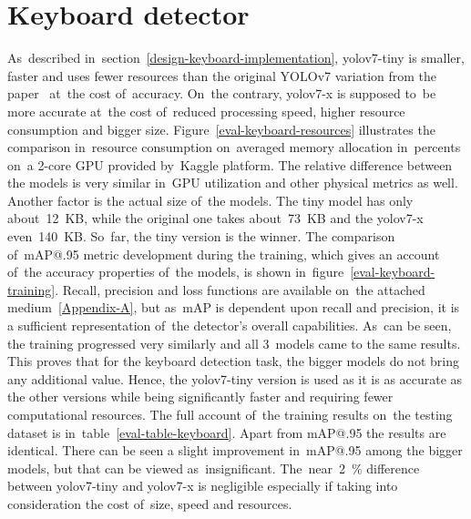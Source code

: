 \section{Keyboard detector}
\label{evaluation-keyboard}
As~described in~section~\ref{design-keyboard-implementation}, yolov7-tiny is smaller, faster and uses fewer resources than the original YOLOv7 variation from the paper~\cite{yolov7} at~the cost of~accuracy. On~the contrary, yolov7-x is supposed to~be more accurate at~the cost of~reduced processing speed, higher resource consumption and bigger size. Figure~\ref{eval-keyboard-resources} illustrates the comparison in~resource consumption on~averaged memory allocation in~percents on~a \hbox{2-core} GPU provided by~Kaggle platform. The relative difference between the models is very similar in~GPU utilization and other physical metrics as well. Another factor is the actual size of~the models. The tiny model has only about~12~KB, while the original one takes about~73~KB and the yolov7-x even~140~KB. So~far, the tiny version is the winner. The comparison of~mAP@.95 metric development during the training, which gives an account of~the accuracy properties of~the models, is shown in~figure~\ref{eval-keyboard-training}. Recall, precision and loss functions are available on~the attached medium~\ref{Appendix-A}, but as~mAP is dependent upon recall and precision, it is a sufficient representation of~the detector's overall capabilities. As~can be seen, the training progressed very similarly and all 3~models came to the same results. This proves that for the keyboard detection task, the bigger models do not bring any additional value. Hence, the yolov7-tiny version is used as it is as accurate as the other versions while being significantly faster and requiring fewer computational resources. The full account of~the training results on~the testing dataset is in~table~\ref{eval-table-keyboard}. Apart from mAP@.95 the results are identical. There can be seen a slight improvement in~mAP@.95 among the bigger models, but that can be viewed as~insignificant. The~near~2~\% difference between yolov7-tiny and yolov7-x is negligible especially if taking into consideration the cost of~size, speed and resources.

